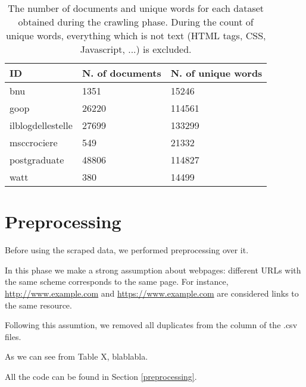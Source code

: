 \begin{table}[H]
    \begin{center}
        \begin{tabular}{ |l|l|l| }
            \hline
            ID                & N. of documents & N. of unique words \\
            \hline
            bnu               & 1351            & 15246              \\
            \hline
            goop              & 26220           & 114561             \\
            \hline
            ilblogdellestelle & 27699           & 133299             \\
            \hline
            msccrociere       & 549             & 21332              \\
            \hline
            postgraduate      & 48806           & 114827             \\
            \hline
            watt              & 380             & 14499              \\
            \hline
        \end{tabular}
    \end{center}
    \caption{
        The number of documents and unique words for each dataset obtained during the crawling phase.
        During the count of unique words, everything which is not text (HTML tags, CSS, Javascript, ...) is excluded.
    }
    \label{table:dbdata}
\end{table}

\section{Preprocessing}
Before using the scraped data, we performed preprocessing over it.

In this phase we make a strong assumption about webpages:
different URLs with the same scheme corresponds to the same page.
For instance, \url{http://www.example.com} and \url{https://www.example.com}
are considered links to the same resource.

Following this assumtion, we removed all duplicates from the  column
of the .csv files.

As we can see from Table X, blablabla.

All the code can be found in Section \ref{preprocessing}.